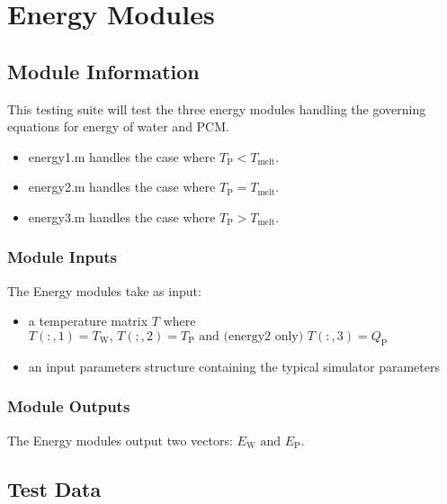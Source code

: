 \documentclass[12pt]{article}
\begin{document}
\section{Energy Modules}

\subsection{Module Information}
This testing suite will test the three energy modules handling the governing 
equations for energy of water and PCM.
\begin{itemize}
\item energy1.m handles the case where $T_{\text{P}} < T_{\text{melt}}$.
\item energy2.m handles the case where $T_{\text{P}} = T_{\text{melt}}$.
\item energy3.m handles the case where $T_{\text{P}} > T_{\text{melt}}$.
\end{itemize}

\subsubsection{Module Inputs}
The Energy modules take as input:
\begin{itemize}
\item a temperature matrix $T$ where $T(:,1) = T_{\text{W}} \text{, }
T(;,2) = T_{\text{P}} \text{ and (energy2 only) } T(:,3) = Q_{\text{P}}$
\item an input parameters structure containing the typical simulator parameters
\end{itemize}

\subsubsection{Module Outputs}
The Energy modules output two vectors: $E_{\text{W}} \text{ and } E_{\text{P}}$.

\subsection{Test Data}
\end{document}
